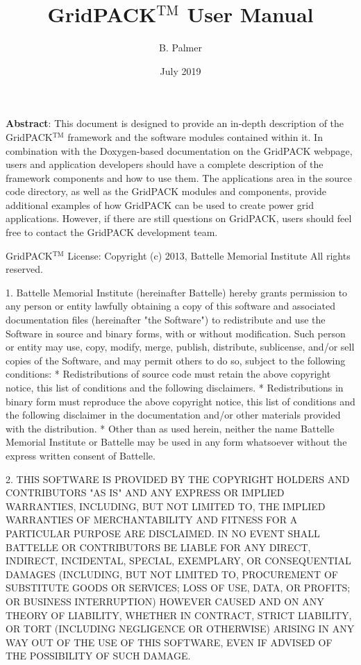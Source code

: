 \documentclass[12pt]{report} %
\begin{document}



\title{GridPACK$\mathrm{{}^{TM}}$ User Manual}
\author{B. Palmer}
\date{July 2019}
\maketitle



\textbf{Abstract}:
This document is designed to provide an in-depth description of the GridPACK$\mathrm{{}^{TM}}$ framework and the software modules contained within it. In combination with the Doxygen-based documentation on the GridPACK webpage, users and application developers should have a complete description of the framework components and how to use them. The applications area in the source code directory, as well as the GridPACK modules and components, provide additional examples of how GridPACK can be used to create power grid applications. However, if there are still questions on GridPACK, users should feel free to contact the GridPACK development team.
\eject 

GridPACK$\mathrm{{}^{TM}}$ License: Copyright (c) 2013, Battelle Memorial Institute All rights reserved.

1. Battelle Memorial Institute (hereinafter Battelle) hereby grants permission to any person or entity lawfully obtaining a copy of this software and associated documentation files (hereinafter "the Software") to redistribute and use the Software in source and binary forms, with or without modification.  Such person or entity may use, copy, modify, merge, publish, distribute, sublicense, and/or sell copies of the Software, and may permit others to do so, subject to the following conditions:
* Redistributions of source code must retain the above copyright notice, this list of conditions and the following disclaimers. 
* Redistributions in binary form must reproduce the above copyright notice, this list of conditions and the following disclaimer in the documentation and/or other materials provided with the distribution. 
* Other than as used herein, neither the name Battelle Memorial Institute or Battelle may be used in any form whatsoever without the express written consent of Battelle.   

2.      THIS SOFTWARE IS PROVIDED BY THE COPYRIGHT HOLDERS AND CONTRIBUTORS "AS IS" AND ANY EXPRESS OR IMPLIED WARRANTIES, INCLUDING, BUT NOT LIMITED TO, THE IMPLIED WARRANTIES OF MERCHANTABILITY AND FITNESS FOR A PARTICULAR PURPOSE ARE DISCLAIMED. IN NO EVENT SHALL BATTELLE OR CONTRIBUTORS BE LIABLE FOR ANY DIRECT, INDIRECT, INCIDENTAL, SPECIAL, EXEMPLARY, OR CONSEQUENTIAL DAMAGES (INCLUDING, BUT NOT LIMITED TO, PROCUREMENT OF SUBSTITUTE GOODS OR SERVICES; LOSS OF USE, DATA, OR PROFITS; OR BUSINESS INTERRUPTION) HOWEVER CAUSED AND ON ANY THEORY OF LIABILITY, WHETHER IN CONTRACT, STRICT LIABILITY, OR TORT (INCLUDING NEGLIGENCE OR OTHERWISE) ARISING IN ANY WAY OUT OF THE USE OF THIS SOFTWARE, EVEN IF ADVISED OF THE POSSIBILITY OF SUCH DAMAGE.
\end{document}
